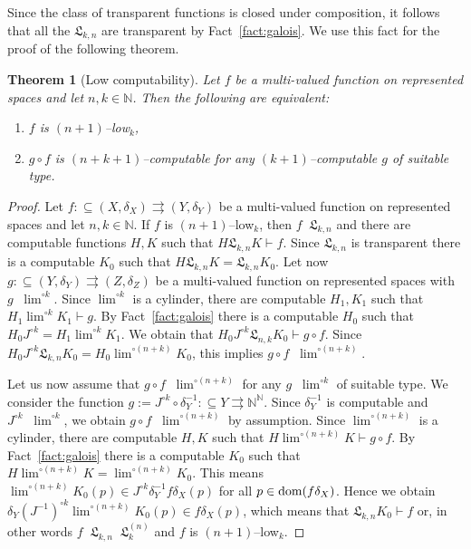 \documentclass[a4paper]{amsart}
\def\IN{{\mathbb{N}}}
\def\Low{\mathfrak{L}}
\def\In{\subseteq}
\def\mto{\rightrightarrows}
\def\dom{{\rm dom}}
\def\Baire{{\IN^\IN}}
\def\leqW{\mathop{\leq_{\mathrm{W}}}}
\def\leqSW{\mathop{\leq_{\mathrm{sW}}}}
\def\equivSW{\mathop{\equiv_{\mathrm{sW}}}}
\newtheorem{theorem}{Theorem}[section]
\theoremstyle{definition}
\begin{document}
Since the class of transparent functions is closed under composition, it follows that all the $\Low_{k,n}$ are transparent
by Fact~\ref{fact:galois}.
We use this fact for the proof of the following theorem.

\begin{theorem}[Low computability]
\label{thm:low}
Let $f$ be a multi-valued function on represented spaces and let $n,k\in\IN$. Then the following are equivalent:
\begin{enumerate}
\item $f$ is $(n+1)$--low$_k$,
\item $g\circ f$ is $(n+k+1)$--computable for any $(k+1)$--computable $g$ of suitable type.
\end{enumerate}
\end{theorem}
\begin{proof}
Let $f:\In(X,\delta_X)\mto(Y,\delta_Y)$ be a multi-valued function on represented spaces and let $n,k\in\IN$.
If $f$ is $(n+1)$--low$_k$, then $f\leqSW\Low_{k,n}$ and there are computable functions $H,K$ such that $H\Low_{k,n}K\vdash f$.
Since $\Low_{k,n}$ is transparent there is a computable $K_0$ such that $H\Low_{k,n}K=\Low_{k,n}K_0$.
Let now $g:\In(Y,\delta_Y)\mto(Z,\delta_Z)$ be a multi-valued function on represented spaces with $g\leqW\lim^{\circ k}$.
Since $\lim^{\circ k}$ is a cylinder, there are computable $H_1,K_1$ such that $H_1\lim^{\circ k}K_1\vdash g$. 
By Fact~\ref{fact:galois} there is a computable $H_0$ such that $H_0J^{\circ k}=H_1\lim^{\circ k}K_1$.
We obtain that $H_0J^{\circ k}\Low_{n,k}K_0\vdash g\circ f$.
Since $H_0J^{\circ k}\Low_{k,n}K_0=H_0\lim^{\circ(n+k)}K_0$, this implies
$g\circ f\leqSW\lim^{\circ(n+k)}$.

Let us now assume that $g\circ f\leqW\lim^{\circ(n+k)}$ for any $g\leqW\lim^{\circ k}$ of suitable type.
We consider the function $g:=J^{\circ k}\circ\delta_Y^{-1}:\In Y\mto\Baire$. Since $\delta_Y^{-1}$ is 
computable and $J^{\circ k}\leqW\lim^{\circ k}$, we obtain $g\circ f\leqW\lim^{\circ(n+k)}$ by assumption.
Since $\lim^{\circ(n+k)}$ is a cylinder, there are computable $H,K$ such that $H\lim^{\circ(n+k)}K\vdash g\circ f$.
By Fact~\ref{fact:galois} there is a computable $K_0$ such that $H\lim^{\circ(n+k)}K=\lim^{\circ(n+k)}K_0$. 
This means $\lim^{\circ(n+k)}K_0(p)\in J^{\circ k}\delta_Y^{-1}f\delta_X(p)$ for all $p\in\dom(f\delta_X)$.
Hence we obtain $\delta_Y(J^{-1})^{\circ k}\lim^{\circ(n+k)}K_0(p)\in f\delta_X(p)$, which means
that $\Low_{k,n}K_0\vdash f$ or, in other words $f\leqSW\Low_{k,n}\equivSW\Low_k^{(n)}$ and $f$ is $(n+1)$--low$_k$.
\end{proof}
\end{document}
